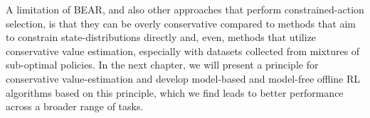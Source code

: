  A limitation of BEAR, and also other approaches that perform constrained-action selection, is that they can be overly conservative compared to methods that aim to constrain state-distributions directly and, even, methods that utilize conservative value estimation, especially with datasets collected from mixtures of sub-optimal policies. In the next chapter, we will present a principle for conservative value-estimation and develop model-based and model-free offline RL algorithms based on this principle, which we find leads to better performance across a broader range of tasks.  

